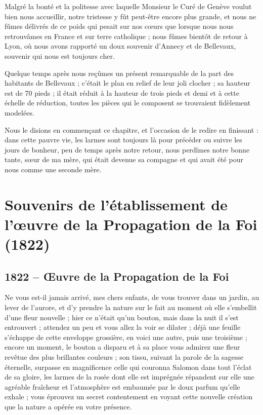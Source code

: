 \documentclass[11pt,a4paper]{report}
\begin{document}
Malgré la bonté et la politesse avec laquelle Monsieur le Curé de Genève voulut bien nous accueillir, notre tristesse y fût peut-être encore plus grande, et nous ne fûmes délivrés de ce poids qui pesait sur nos cœurs que lorsque nous nous retrouvâmes en France et sur terre catholique ; nous fûmes bientôt de retour à Lyon, où nous avons rapporté un doux souvenir d'Annecy et de Bellevaux, souvenir qui nous est toujours cher.

Quelque temps après nous reçûmes un présent remarquable de la part des habitants de Bellevaux ; c'était le plan en relief de leur joli clocher ; sa hauteur est de 70 pieds ; il était réduit à la hauteur de trois pieds et demi et à cette échelle de réduction, toutes les pièces qui le composent se trouvaient fidèlement modelées.

Nous le disions en commençant ce chapitre, et l'occasion de le redire en finissant : dans cette pauvre vie, les larmes sont toujours là pour précéder ou suivre les jours de bonheur, peu de temps après notre retour, nous perdîmes notre bonne tante, sœur de ma mère, qui était devenue sa compagne et qui avait été pour nous comme une seconde mère.


\chapter{Souvenirs de l'établissement de l'œuvre de la Propagation de la Foi (1822)}

\section*{1822 -- Œuvre de la Propagation de la Foi}

Ne vous est-il jamais arrivé, mes chers enfants, de vous trouver dans un jardin, au lever de l'aurore, et d'y prendre la nature sur le fait au moment où elle s'embellit d'une fleur nouvelle ; hier ce n'était qu'un bouton, mais dans la nuit il s'est entrouvert ; attendez un peu et vous allez la voir se dilater ; déjà une feuille s'échappe de cette enveloppe grossière, en voici une autre, puis une troisième ; encore un moment, le bouton a disparu et à sa place vous admirez une fleur revêtue des plus brillantes couleurs ; son tissu, suivant la parole de la sagesse éternelle, surpasse en magnificence celle qui couronna Salomon dans tout l'éclat de sa gloire, les larmes de la rosée dont elle est imprégnée répandent sur elle une agréable fraîcheur et l'atmosphère est embaumée par le doux parfum qu'elle exhale ; vous éprouvez un secret contentement en voyant cette nouvelle création que la nature a opérée en votre présence.
\end{document}
